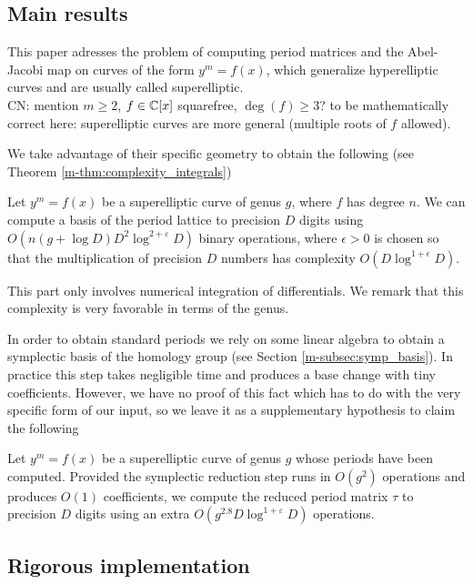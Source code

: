 \documentclass[main.tex]{subfiles}
\begin{document}
  \subsection{Main results}

  This paper adresses the problem of computing period matrices and the
  Abel-Jacobi map on curves of the form $y^m = f(x)$, which generalize
  hyperelliptic curves and are usually called superelliptic.
  \\
 \todo CN: mention $m \ge 2$, $f \in \mathbb{C}[x]$ squarefree, $\deg(f) \ge 3$? to be mathematically correct here: superelliptic curves are more general (multiple roots of $f$ allowed).
  
  We take advantage of their specific geometry to obtain the following
  (see Theorem \ref{m-thm:complexity_integrals})
  \begin{thm}
      Let $y^m=f(x)$ be a superelliptic curve of genus $g$,
      where $f$ has degree $n$.
      We can compute a basis of the period lattice to precision
      $D$ digits using $O(n(g+\log D)D^2\log^{2+\varepsilon} D)$
      binary operations, where $\epsilon>0$ is chosen so that
      the multiplication of precision $D$ numbers has complexity
      $O(D\log^{1+\epsilon}D)$.
  \end{thm}

  This part only involves numerical integration of differentials. We remark
  that this complexity is very favorable in terms of the genus.

  In order
  to obtain standard periods we rely on some linear algebra to obtain a
  symplectic basis of the homology group (see Section \ref{m-subsec:symp_basis}).
  In practice this step takes negligible time
  and produces a base change with tiny coefficients. However, we have no proof
  of this fact which has to do with the very specific form of our input,
  so we leave it as a supplementary hypothesis to claim the
  following
  \begin{thm}
      Let $y^m=f(x)$ be a superelliptic curve of genus $g$ whose periods
      have been computed.
      Provided the symplectic reduction
      step runs in $O(g^2)$ operations and produces $O(1)$ coefficients,
      we compute the reduced period matrix $τ$ to precision $D$
      digits using an extra $O(g^{2.8}D\log^{1+\varepsilon}D)$ operations.
  \end{thm}

  \subsection{Rigorous implementation}
\end{document}
